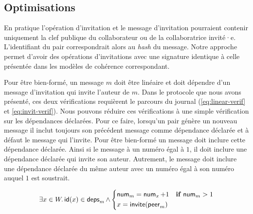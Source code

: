 \clearpage

\subsection{Optimisations}

En pratique l'opération d'invitation et le message d'invitation pourraient contenir uniquement la clef publique du collaborateur ou de la collaboratrice invité·e.
L'identifiant du pair correspondrait alors au \emph{hash} du message.
Notre approche permet d'avoir des opérations d'invitations avec une signature identique à celle présentée dans les modèles de cohérence correspondant.

Pour être bien-formé, un message $m$ doit être linéaire et doit dépendre d'un message d'invitation qui invite l'auteur de $m$.
Dans le protocole que nous avons présenté, ces deux vérifications requièrent le parcours du journal (\autoref{eq:linear-verif} et \autoref{eq:invit-verif}).
Nous pouvons réduire ces vérifications à une simple vérification sur les dépendances déclarées.
Pour ce faire, lorsqu'un pair génère un nouveau message il inclut toujours son précédent message comme dépendance déclarée et à défaut le message qui l'invite.
Pour être bien-formé un message doit inclure cette dépendance déclarée.
Ainsi si le message à un numéro égal à $1$, il doit inclure une dépendance déclarée qui invite son auteur.
Autrement, le message doit inclure une dépendance déclarée du même auteur avec un numéro égal à son numéro auquel $1$ est soustrait.

\begin{equation*}
    \exists x \in W \ldotp \operatorname{\mathsf{id}}(x) \in \operatorname{\mathsf{deps}}_m \land \begin{dcases}
    \operatorname{\mathsf{num}}_m = \operatorname{\mathsf{num}}_x + 1 & \mathrel{\mathbf{if}} \operatorname{\mathsf{num}}_m > 1\\
    x = \operatorname{\mathsf{invite}}(\operatorname{\mathsf{peer}}_m)
    \end{dcases}
\end{equation*}


